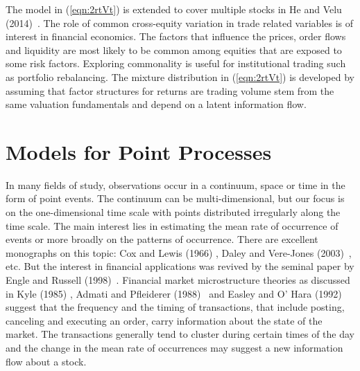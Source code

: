The model in (\ref{eqn:2rtVt}) is extended to cover multiple stocks in He and Velu (2014)~\cite{}. The role of common cross-equity variation in trade related variables is of interest in financial economics. The factors that influence the prices, order flows and liquidity are most likely to be common among equities that are exposed to some risk factors. Exploring commonality is useful for institutional trading such as portfolio rebalancing. The mixture distribution in (\ref{eqn:2rtVt}) is developed by assuming that factor structures for returns are trading volume stem from the same valuation fundamentals and depend on a latent information flow. 


\section{Models for Point Processes}


In many fields of study, observations occur in a continuum, space or time in the form of point events. The continuum can be multi-dimensional, but our focus is on the one-dimensional time scale with points distributed irregularly along the time scale. The main interest lies in estimating the mean rate of occurrence of events or more broadly on the patterns of occurrence. There are excellent monographs on this topic: Cox and Lewis (1966) \cite{cox1966}, Daley and Vere-Jones (2003)~\cite{daley2003}, etc. But the interest in financial applications was revived by the seminal paper by Engle and Russell (1998)~\cite{engle1998}. Financial market microstructure theories as discussed in Kyle (1985) \cite{kyle1985}, Admati and Pfleiderer (1988)~\cite{admati1988theory} and Easley and O' Hara (1992)~\cite{easley1992} suggest that the frequency and the timing of transactions, that include posting, canceling and executing an order, carry information about the state of the market. The transactions generally tend to cluster during certain times of the day and the change in the mean rate of occurrences may suggest a new information flow about a stock.


